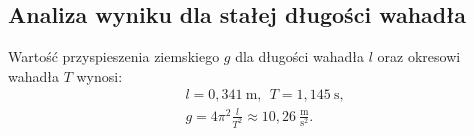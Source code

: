\documentclass[12pt,a4paper]{article}
\begin{document}

\subsection{Analiza wyniku dla stałej długości wahadła}
Wartość przyspieszenia ziemskiego $g$ dla długości wahadła $l$ oraz okresowi wahadła $T$ wynosi:
\begin{equation}
	\begin{split}
		&l = 0,341~\textrm{m},~~T = 1,145~\textrm{s}, \\ 
		&g = 4\pi^2\frac{l}{T^2} \approx 10,26~\frac{\textrm{m}}{\textrm{s}^2}.
	\end{split}
\end{equation}
\end{document}
